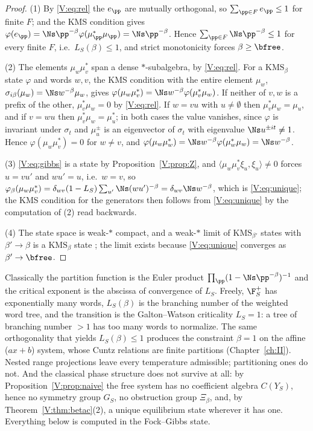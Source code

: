 \begin{proof}
(1) By \eqref{V:eq:rel} the $e_\pp$ are mutually orthogonal, so $\sum_{\pp\in F}e_\pp\le1$ for
finite $F$; and the KMS condition gives
$\varphi(e_\pp)=\Ns\pp^{-\beta}\varphi(\mu_\pp^*\mu_\pp)=\Ns\pp^{-\beta}$. Hence
$\sum_{\pp\in F}\Ns\pp^{-\beta}\le1$ for every finite $F$, i.e.\ $L_S(\beta)\le1$, and strict
monotonicity forces $\beta\ge\bfree$.

(2) The elements $\mu_w\mu_v^*$ span a dense $*$-subalgebra, by \eqref{V:eq:rel}. For a
$\mathrm{KMS}_\beta$ state $\varphi$ and words $w,v$, the KMS condition with the entire
element $\mu_w$, $\sigma_{i\beta}(\mu_w)=\Ns w^{-\beta}\mu_w$, gives
$\varphi(\mu_w\mu_v^*)=\Ns w^{-\beta}\varphi(\mu_v^*\mu_w)$. If neither of $v,w$ is a prefix
of the other, $\mu_v^*\mu_w=0$ by \eqref{V:eq:rel}. If $w=vu$ with $u\ne\emptyset$ then
$\mu_v^*\mu_w=\mu_u$, and if $v=wu$ then $\mu_v^*\mu_w=\mu_u^*$; in both cases the value
vanishes, since $\varphi$ is invariant under $\sigma_t$ and $\mu_u^{\pm}$ is an eigenvector
of $\sigma_t$ with eigenvalue $\Ns u^{\pm it}\ne1$. Hence $\varphi(\mu_w\mu_v^*)=0$ for
$w\ne v$, and $\varphi(\mu_w\mu_w^*)=\Ns w^{-\beta}\varphi(\mu_w^*\mu_w)=\Ns w^{-\beta}$.

(3) \eqref{V:eq:gibbs} is a state by Proposition~\ref{V:prop:Z}, and
$\langle\mu_w\mu_v^*\xi_u,\xi_u\rangle\ne0$ forces $u=vu'$ and $wu'=u$, i.e.\ $w=v$, so
$\varphi_\beta(\mu_w\mu_v^*)=\delta_{wv}(1-L_S)\sum_{u'}\Ns(wu')^{-\beta}=\delta_{wv}\Ns w^{-\beta}$,
which is \eqref{V:eq:unique}; the KMS condition for the generators then follows from
\eqref{V:eq:unique} by the computation of (2) read backwards.

(4) The state space is weak-$*$ compact, and a weak-$*$ limit of $\mathrm{KMS}_{\beta'}$
states with $\beta'\to\beta$ is a $\mathrm{KMS}_\beta$ state \cite[Prop.~5.3.25]{BR};
the limit exists because \eqref{V:eq:unique} converges as $\beta'\to\bfree$.
\end{proof}

\begin{remark}\label{V:rem:branch}
Classically the partition function is the Euler product
$\prod_\pp(1-\Ns\pp^{-\beta})^{-1}$ and the critical exponent is the abscissa of convergence
of $L_S$. Freely, $\F_S^+$ has exponentially many words, $L_S(\beta)$ is the branching number
of the weighted word tree, and the transition is the Galton--Watson criticality $L_S=1$: a
tree of branching number $>1$ has too many words to normalize. The same orthogonality that
yields $L_S(\beta)\le1$ produces the constraint $\beta=1$ on the affine ($ax+b$) system,
whose Cuntz relations are finite partitions (Chapter~\ref{ch:II}). Nested range projections leave
every temperature admissible; partitioning ones do not. And the classical phase structure
does not survive at all: by Proposition~\ref{V:prop:naive} the free system has no coefficient
algebra $C(Y_S)$, hence no symmetry group $G_S$, no obstruction group $\Xi_\beta$, and, by
Theorem~\ref{V:thm:betac}(2), a unique equilibrium state wherever it has one. Everything
below is computed in the Fock--Gibbs state.
\end{remark}


